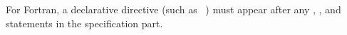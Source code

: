 For Fortran, a declarative directive (such as ~)
must appear after any , , and  statements
in the specification part.








